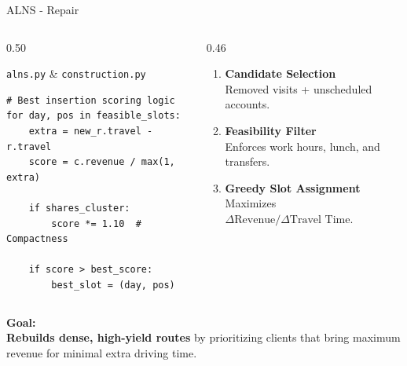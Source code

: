 \begin{frame}[fragile]{ALNS - Repair}
\begin{columns}[T,onlytextwidth]
\begin{column}{0.50\textwidth}
\begin{block}{\texttt{alns.py} \& \texttt{construction.py}}
\scriptsize
\begin{verbatim}
# Best insertion scoring logic
for day, pos in feasible_slots:
    extra = new_r.travel - r.travel
    score = c.revenue / max(1, extra)
    
    if shares_cluster:
        score *= 1.10  # Compactness

    if score > best_score:
        best_slot = (day, pos)
\end{verbatim}
\end{block}
\end{column}

\begin{column}{0.46\textwidth}
\vspace{0.15cm}
\footnotesize
\begin{enumerate}
    \item \textbf{Candidate Selection}\\
    Removed visits + unscheduled accounts.
    \vspace{0.2cm}
    \item \textbf{Feasibility Filter}\\
    Enforces work hours, lunch, and transfers.
    \vspace{0.2cm}
    \item \textbf{Greedy Slot Assignment}\\
    Maximizes $\Delta\text{Revenue} / \Delta\text{Travel Time}$.
\end{enumerate}
\end{column}
\end{columns}

\vspace{0.3cm}
\footnotesize
\textbf{Goal:}\\
\textbf{Rebuilds dense, high-yield routes} by prioritizing clients that bring maximum revenue for minimal extra driving time.
\end{frame}
